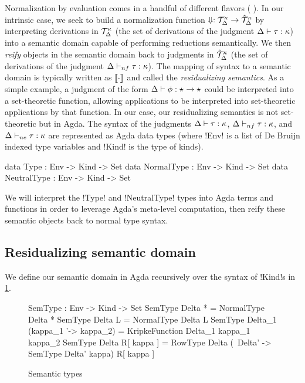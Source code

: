 \documentclass[sigplan,10pt,anonymous,review]{acmart}\settopmatter{printfolios=true,printccs=false,printacmref=false}
\begin{document}
\InlineOn{}
Normalization by evaluation comes in a handful of different flavors (\cf{} \citet{Lindley05, Abel13}). In our intrinsic case, we seek to build a normalization function $\Downarrow : {\mathcal T}_{\Delta}^{\kappa} \to \hat{{\mathcal T}}_{\Delta}^{\kappa}$ by interpreting derivations in ${\mathcal T}_{\Delta}^{\kappa}$ (the set of derivations of the judgment $\Delta \vdash \tau : \kappa$) into a semantic domain capable of performing reductions semantically. We then \emph{reify} objects in the semantic domain back to judgments in $\hat{{\mathcal T}}_{\Delta}^{\kappa}$ (the set of derivations of the judgment $\Delta \vdash_{nf} \tau : \kappa$). The mapping of syntax to a semantic domain is typically written as $\llbracket \cdot \rrbracket$ and called the \emph{residualizing semantics}. As a simple example, a judgment of the form $\Delta \vdash \phi : \star_{} \to \star_{}$ could be interpreted into a set-theoretic function, allowing applications to be interpreted into set-theoretic applications by that function. In our case, our residualizing semantics is not set-theoretic but in Agda. The syntax of the judgments $\Delta \vdash \tau : \kappa$, $\Delta \vdash_{nf} \tau : \kappa$, and $\Delta \vdash_{ne} \tau : \kappa$ are represented as Agda data types (where !Env! is a list of De Bruijn indexed type variables and !Kind! is the type of kinds). 

\begin{agda}
data Type : Env -> Kind -> Set
data NormalType : Env -> Kind -> Set
data NeutralType : Env -> Kind -> Set 
\end{agda}

\Ni We will interpret the !Type! and !NeutralType! types into Agda terms and functions in order to leverage Agda's meta-level computation, then reify these semantic objects back to normal type syntax.

\subsection{Residualizing semantic domain}

We define our semantic domain in Agda recursively over the syntax of !Kind!s in \cref{fig:SemType}.

\begin{figure}
\begin{agda}
SemType : Env -> Kind -> Set
SemType Delta * = NormalType Delta *
SemType Delta L = NormalType Delta L 
SemType Delta_1 (kappa_1 '-> kappa_2) = KripkeFunction Delta_1  kappa_1  kappa_2 
SemType Delta R[ kappa ] = 
  RowType Delta (\ Delta' -> SemType Delta' kappa) R[ kappa ]
\end{agda}
\caption{Semantic types}
\label{fig:SemType}
\end{figure}
\end{document}

